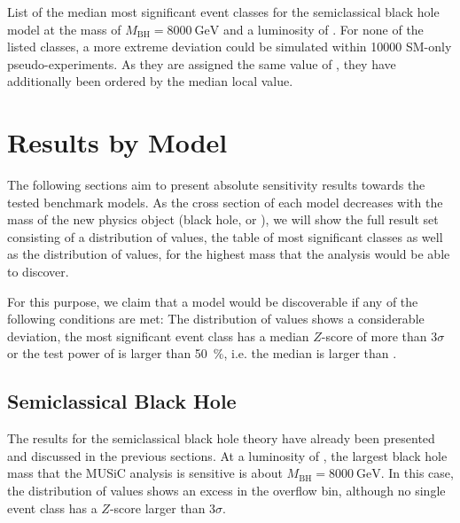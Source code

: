 \begin{table}
    \centering
    {
        
    }
    \caption{List of the median most significant event classes for the semiclassical black hole model at the mass of $M_\text{BH} = \SI{8000}{\GeV}$ and a luminosity of \lumiB. For none of the listed classes, a more extreme deviation could be simulated within \num{10000} \ac{SM}-only pseudo-experiments. As they are assigned the same value of \ptilde, they have additionally been ordered by the median local \TS value.}
    \label{tab:bh_table_2016}
\end{table}


\section{Results by Model}
\label{sec:results}

The following sections aim to present absolute sensitivity results towards the tested benchmark models. As the cross section of each model decreases with the mass of the new physics object (black hole, \PSigma or \PWprime), we will show the full result set consisting of a distribution of \ptilde values, the table of most significant classes as well as the distribution of \TSphat values, for the highest mass that the analysis would be able to discover. 

For this purpose, we claim that a model would be discoverable if any of the following conditions are met: The distribution of \ptilde values shows a considerable deviation, the most significant event class has a median $Z$-score of more than $\num{3}\sigma$ or the test power of \TSphat is larger than \SI{50}{\percent}, i.e. the median \TSphat is larger than \TSphatcrit.

\subsection{Semiclassical Black Hole}
\label{sec:results_bh}

The results for the semiclassical black hole theory have already been presented and discussed in the previous sections. At a luminosity of \lumiA, the largest black hole mass that the \ac{MUSiC} analysis is sensitive is about $M_\text{BH} = \SI{8000}{\GeV}$. In this case, the distribution of \ptilde values shows an excess in the overflow bin, although no single event class has a $Z$-score larger than $\num{3}\sigma$.

